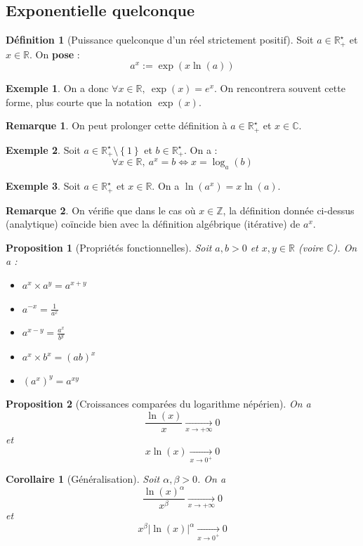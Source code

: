 \documentclass[french]{book}
\newcommand{\Z}{\mathbb{Z}}
\newcommand{\R}{\mathbb{R}}
\newcommand{\C}{\mathbb{C}}
\newcommand{\st}{^\star}
\theoremstyle{plain}
\newtheorem{prop}{Proposition}[chapter]
\newtheorem{cor}{Corollaire}[chapter]
\theoremstyle{definition}
\newtheorem{dfn}{Définition}[chapter]
\newtheorem{exa}{Exemple}[chapter]
\newtheorem{rmq}{Remarque}[chapter]
\theoremstyle{remark}
\begin{document}
\subsection{Exponentielle quelconque}
\begin{dfn}[Puissance quelconque d'un réel strictement positif]
	Soit $a\in\R_+\st$ et $x\in\R$. On \textbf{pose} : $$a^x:=\exp(x\ln(a))$$
\end{dfn}
\begin{exa}
	On a donc $\forall x\in\R,\ \exp(x)=e^x$. On rencontrera souvent cette forme, plus courte que la notation $\exp(x)$.
\end{exa}
\begin{rmq}
	On peut prolonger cette définition à $a\in\R_+\st$ et $x\in\C$.
\end{rmq}
\begin{exa}
	Soit $a\in\R_+\st\setminus\left\{1\right\}$ et $b\in\R_+\st$. On a : $$\forall x\in\R,\ a^x=b\iff x=\log_a(b)$$
\end{exa}
\begin{exa}
	Soit $a\in\R_+\st$ et $x\in\R$. On a $\ln(a^x)=x\ln(a)$.
\end{exa}
\begin{rmq}
	On vérifie que dans le cas où $x\in\Z$, la définition donnée ci-dessus (analytique) coïncide bien avec la définition algébrique (itérative) de $a^x$.
\end{rmq}
\begin{prop}[Propriétés fonctionnelles]
	Soit $a,b>0$ et $x,y\in\R$ (voire $\C$). On a :
	\begin{itemize}
		\item $a^x\times a^y=a^{x+y}$
		\item $a^{-x}=\displaystyle\frac{1}{a^x}$
		\item $a^{x-y}=\displaystyle\frac{a^x}{b^y}$
		\item $a^x\times b^x=(ab)^x$
		\item $(a^x)^y=a^{xy}$
	\end{itemize}
\end{prop}
\begin{prop}[Croissances comparées du logarithme népérien]
	On a $$\frac{\ln(x)}{x}\xrightarrow[x\to +\infty]{}0$$ et $$x\ln(x)\xrightarrow[x\to 0^+]{}0$$
\end{prop}
\begin{cor}[Généralisation]
	Soit $\alpha,\beta>0$. On a $$\frac{\ln(x)^\alpha}{x^\beta}\xrightarrow[x\to +\infty]{}0$$ et $$x^\beta\lvert\ln(x)\rvert^\alpha\xrightarrow[x\to 0^+]{}0$$
\end{cor}
\end{document}
